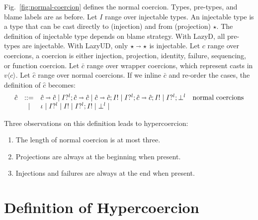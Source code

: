 \documentclass[acmsmall,review,anonymous]{acmart}\settopmatter{printfolios=true,printccs=false,printacmref=false}
\newcommand{\figref}[1]{Fig.~\ref{#1}}
\newcommand{\stxrule}[3]{#1 & ::= & #3 & \text{#2}\\}
\newcommand{\stxrulecont}[1]{& | & #1 & \\}
\newcommand{\lazyUD}{Lazy\;UD}
\newcommand{\lazyD}{Lazy\;D}
\newcommand{\TOOdyn}[0]{\star}
\newcommand{\POOfun}[2]{#1 \shortrightarrow #2}
\newcommand{\vOOcast}[2]{#1\langle#2\rangle}
\newcommand{\ncProj}[2]{#1?^{#2}}
\newcommand{\ncInj}[1]{#1!}
\newcommand{\ncId}[0]{\iota}
\newcommand{\ncSeq}[2]{#1;#2}
\newcommand{\ncFail}[1]{\bot^{#1}}
\newcommand{\ncFun}[2]{\POOfun{#1}{#2}}
\begin{document}
\figref{fig:normal-coercion} defines the normal coercion.
Types, pre-types, and blame labels are as before.
Let $I$ range over injectable types. An injectable type is a type that can 
be cast directly to (injection) and from (projection) $\TOOdyn$. The 
definition of injectable type depends on blame strategy. With \lazyD, all 
pre-types are injectable. With \lazyUD, only $\POOfun{\TOOdyn}{\TOOdyn}$
is injectable. 
Let $c$ range over coercions, a coercion is either injection, projection, 
identity, failure, sequencing, or function coercion.
Let $\bar{c}$ range over wrapper coercions, which represent casts in $
\vOOcast{v}{c}$.
Let $\hat{c}$ range over normal coercions. If we inline $\bar{c}$ and 
re-order the cases, the definition of $\hat{c}$ becomes:
\[
\begin{array}{rclr}
\stxrule{\hat{c}}{normal coercions}{
	\ncFun{\hat{c}}{\hat{c}} \mid
	\ncSeq{\ncProj{I}{l}}{\ncFun{\hat{c}}{\hat{c}}} \mid
	\ncSeq{\ncFun{\hat{c}}{\hat{c}}}{\ncInj{I}} \mid
	\ncSeq{\ncProj{I}{l}}{\ncSeq{\ncFun{\hat{c}}{\hat{c}}}{\ncInj{I}}} \mid
	\ncSeq{\ncProj{I}{l}}{\ncFail{l}}
}
\stxrulecont{
	\ncId \mid
	\ncProj{I}{l} \mid
	\ncInj{I} \mid
	\ncSeq{\ncProj{I}{l}}{\ncInj{I}} \mid
	\ncFail{l} \mid
}
\end{array}
\]

Three observations on this definition leads to hypercoercion: 
\begin{enumerate}
	\item The length of normal coercion is at most three.
	\item Projections are always at the beginning when present.
	\item Injections and failures are always at the end when present.
\end{enumerate}


\section{Definition of Hypercoercion} \label{sec:hypercoercion-definition}
\end{document}

